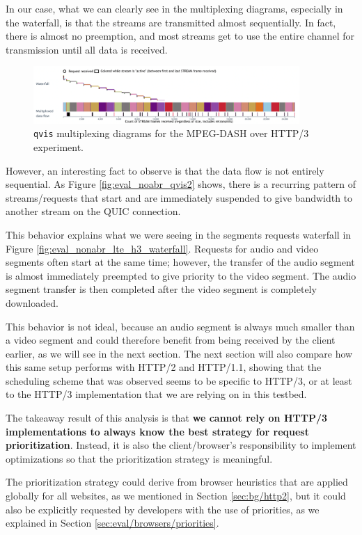 In our case, what we can clearly see in the multiplexing diagrams, especially in the waterfall, is that the streams are transmitted almost sequentially. In fact, there is almost no preemption, and most streams get to use the entire channel for transmission until all data is received.

\begin{figure}[h]
    \centering
    \includegraphics[width=0.9\textwidth]{res/eval_nonabr_qvis1.png}
    \caption{\texttt{qvis} multiplexing diagrams for the MPEG-DASH over HTTP/3 experiment.}
    \label{fig:eval_noabr_qvis1}
\end{figure}

However, an interesting fact to observe is that the data flow is not entirely sequential. As Figure \ref{fig:eval_noabr_qvis2} shows, there is a recurring pattern of streams/requests that start and are immediately suspended to give bandwidth to another stream on the QUIC connection.

This behavior explains what we were seeing in the segments requests waterfall in Figure \ref{fig:eval_nonabr_lte_h3_waterfall}. Requests for audio and video segments often start at the same time; however, the transfer of the audio segment is almost immediately preempted to give priority to the video segment. The audio segment transfer is then completed after the video segment is completely downloaded.

This behavior is not ideal, because an audio segment is always much smaller than a video segment and could therefore benefit from being received by the client earlier, as we will see in the next section. The next section will also compare how this same setup performs with HTTP/2 and HTTP/1.1, showing that the scheduling scheme that was observed seems to be specific to HTTP/3, or at least to the HTTP/3 implementation that we are relying on in this testbed.

The takeaway result of this analysis is that \textbf{we cannot rely on HTTP/3 implementations to always know the best strategy for request prioritization}. Instead, it is also the client/browser's responsibility to implement optimizations so that the prioritization strategy is meaningful.

The prioritization strategy could derive from browser heuristics that are applied globally for all websites, as we mentioned in Section \ref{sec:bg/http2}, but it could also be explicitly requested by developers with the use of priorities, as we explained in Section \ref{sec:eval/browsers/priorities}.

